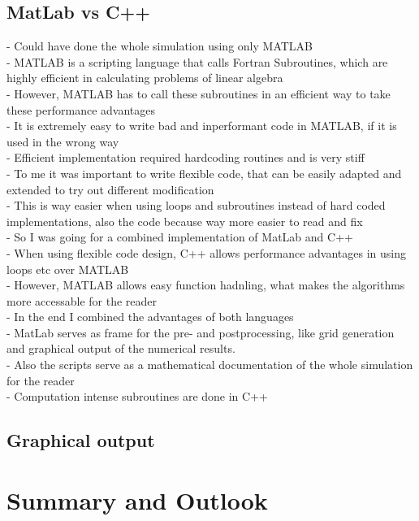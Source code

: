 \documentclass[parskip=half, titlepage=yes, 12pt, BCOR=12mm, DIV=calc]{scrartcl}
\begin{document}
\subsection{MatLab vs C++}
- Could have done the whole simulation using only MATLAB \\
- MATLAB is a scripting language that calls Fortran Subroutines, which are highly efficient in calculating problems of linear algebra \\
- However, MATLAB has to call these subroutines in an efficient way to take these performance advantages \\
- It is extremely easy to write bad and inperformant code in MATLAB, if it is used in the wrong way \\
- Efficient implementation required hardcoding routines and is very stiff \\ 
- To me it was important to write flexible code, that can be easily adapted and extended to try out different modification \\
- This is way easier when using loops and subroutines instead of hard coded implementations, also the code because way more easier to read and fix \\
- So I was going for a combined implementation of MatLab and C++ \\ 
- When using flexible code design, C++ allows performance advantages in using loops etc over MATLAB \\
- However, MATLAB allows easy function hadnling, what makes the algorithms more accessable for the reader \\ 
- In the end I combined the advantages of both languages \\
- MatLab serves as frame for the pre- and postprocessing, like grid generation and graphical output of the numerical results. \\
- Also the scripts serve as a mathematical documentation of the whole simulation for the reader \\
- Computation intense subroutines are done in C++ \\


\subsection{Graphical output}


\section{Summary and Outlook}
\end{document}
